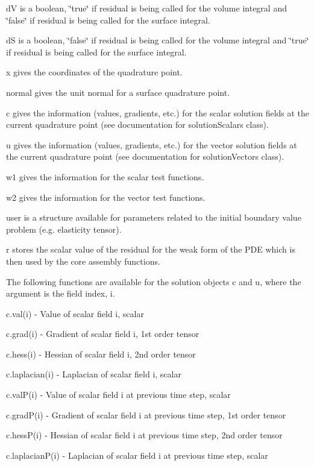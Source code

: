 \begin{DoxyCodeInclude}

\end{DoxyCodeInclude}


{\ttfamily d\-V} is a boolean, \char`\"{}true\char`\"{} if {\ttfamily residual} is being called for the volume integral and \char`\"{}false\char`\"{} if {\ttfamily residual} is being called for the surface integral.\par
{\ttfamily d\-S} is a boolean, \char`\"{}false\char`\"{} if {\ttfamily residual} is being called for the volume integral and \char`\"{}true\char`\"{} if {\ttfamily residual} is being called for the surface integral.\par
{\ttfamily x} gives the coordinates of the quadrature point.\par
{\ttfamily normal} gives the unit normal for a surface quadrature point.\par
{\ttfamily c} gives the information (values, gradients, etc.) for the scalar solution fields at the current quadrature point (see documentation for solution\-Scalars class).\par
{\ttfamily u} gives the information (values, gradients, etc.) for the vector solution fields at the current quadrature point (see documentation for solution\-Vectors class).\par
{\ttfamily w1} gives the information for the scalar test functions.\par
{\ttfamily w2} gives the information for the vector test functions.\par
{\ttfamily user} is a structure available for parameters related to the initial boundary value problem (e.\-g. elasticity tensor).\par
{\ttfamily r} stores the scalar value of the residual for the weak form of the P\-D\-E which is then used by the core assembly functions.

The following functions are available for the solution objects {\ttfamily c} and {\ttfamily u}, where the argument is the field index, i.

{\ttfamily c.\-val(i)} -\/ Value of scalar field i, scalar \par
{\ttfamily c.\-grad(i)} -\/ Gradient of scalar field i, 1st order tensor \par
{\ttfamily c.\-hess(i)} -\/ Hessian of scalar field i, 2nd order tensor \par
{\ttfamily c.\-laplacian(i)} -\/ Laplacian of scalar field i, scalar \par
{\ttfamily c.\-val\-P(i)} -\/ Value of scalar field i at previous time step, scalar \par
{\ttfamily c.\-grad\-P(i)} -\/ Gradient of scalar field i at previous time step, 1st order tensor \par
{\ttfamily c.\-hess\-P(i)} -\/ Hessian of scalar field i at previous time step, 2nd order tensor \par
{\ttfamily c.\-laplacian\-P(i)} -\/ Laplacian of scalar field i at previous time step, scalar

